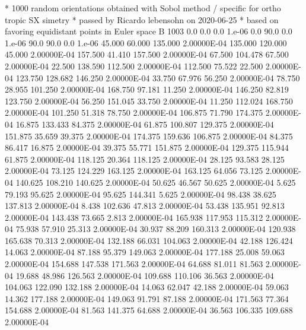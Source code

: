* 1000 random orientations obtained with Sobol method / specific for ortho tropic SX simetry
* passed by Ricardo lebensohn on 2020-06-25
* based on favoring equidistant points in Euler space
B   1003
      0.0     0.0    0.0     1.e-06
      0.0    90.0    0.0     1.e-06
     90.0    90.0    0.0     1.e-06
    45.000    60.000   135.000  2.00000E-04
   135.000   120.000    45.000  2.00000E-04
   157.500    41.410   157.500  2.00000E-04
    67.500   104.478    67.500  2.00000E-04
    22.500   138.590   112.500  2.00000E-04
   112.500    75.522    22.500  2.00000E-04
   123.750   128.682   146.250  2.00000E-04
    33.750    67.976    56.250  2.00000E-04
    78.750    28.955   101.250  2.00000E-04
   168.750    97.181    11.250  2.00000E-04
   146.250    82.819   123.750  2.00000E-04
    56.250   151.045    33.750  2.00000E-04
    11.250   112.024   168.750  2.00000E-04
   101.250    51.318    78.750  2.00000E-04
   106.875    71.790   174.375  2.00000E-04
    16.875   133.433    84.375  2.00000E-04
    61.875   100.807   129.375  2.00000E-04
   151.875    35.659    39.375  2.00000E-04
   174.375   159.636   106.875  2.00000E-04
    84.375    86.417    16.875  2.00000E-04
    39.375    55.771   151.875  2.00000E-04
   129.375   115.944    61.875  2.00000E-04
   118.125    20.364   118.125  2.00000E-04
    28.125    93.583    28.125  2.00000E-04
    73.125   124.229   163.125  2.00000E-04
   163.125    64.056    73.125  2.00000E-04
   140.625   108.210   140.625  2.00000E-04
    50.625    46.567    50.625  2.00000E-04
     5.625    79.193    95.625  2.00000E-04
    95.625   144.341     5.625  2.00000E-04
    98.438    38.625   137.813  2.00000E-04
     8.438   102.636    47.813  2.00000E-04
    53.438   135.951    92.813  2.00000E-04
   143.438    73.665     2.813  2.00000E-04
   165.938   117.953   115.312  2.00000E-04
    75.938    57.910    25.313  2.00000E-04
    30.937    88.209   160.313  2.00000E-04
   120.938   165.638    70.313  2.00000E-04
   132.188    66.031   104.063  2.00000E-04
    42.188   126.424    14.063  2.00000E-04
    87.188    95.379   149.063  2.00000E-04
   177.188    25.008    59.063  2.00000E-04
   154.688   147.538   171.563  2.00000E-04
    64.688    81.011    81.563  2.00000E-04
    19.688    48.986   126.563  2.00000E-04
   109.688   110.106    36.563  2.00000E-04
   104.063   122.090   132.188  2.00000E-04
    14.063    62.047    42.188  2.00000E-04
    59.063    14.362   177.188  2.00000E-04
   149.063    91.791    87.188  2.00000E-04
   171.563    77.364   154.688  2.00000E-04
    81.563   141.375    64.688  2.00000E-04
    36.563   106.335   109.688  2.00000E-04
